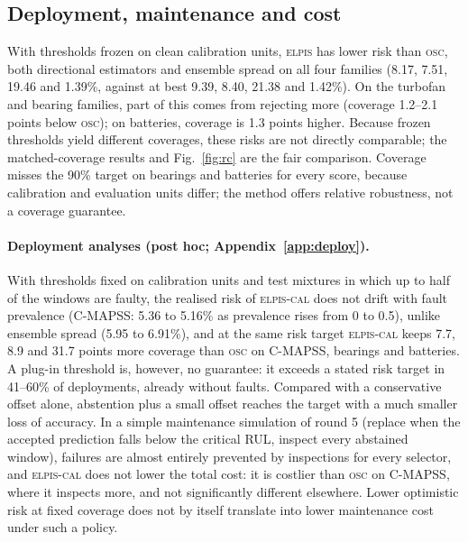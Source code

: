 \documentclass{esannV2}
\newcommand{\OSC}{\textsc{osc}}
\newcommand{\RPT}{\textsc{elpis}}
\newcommand{\AUTO}{\textsc{elpis-cal}}
\begin{document}
\FloatBarrier
\subsection{Deployment, maintenance and cost}
With thresholds frozen on clean calibration units, \RPT{} has lower risk than \OSC, both directional estimators and ensemble spread on all four families (8.17, 7.51, 19.46 and 1.39\%, against at best 9.39, 8.40, 21.38 and 1.42\%). On the turbofan and bearing families, part of this comes from rejecting more (coverage 1.2--2.1 points below \OSC); on batteries, coverage is 1.3 points higher. Because frozen thresholds yield different coverages, these risks are not directly comparable; the matched-coverage results and Fig.~\ref{fig:rc} are the fair comparison. Coverage misses the 90\% target on bearings and batteries for every score, because calibration and evaluation units differ; the method offers relative robustness, not a coverage guarantee.

\paragraph{Deployment analyses (post hoc; Appendix~\ref{app:deploy}).} With thresholds fixed on calibration units and test mixtures in which up to half of the windows are faulty, the realised risk of \AUTO{} does not drift with fault prevalence (C-MAPSS: 5.36 to 5.16\% as prevalence rises from 0 to 0.5), unlike ensemble spread (5.95 to 6.91\%), and at the same risk target \AUTO{} keeps 7.7, 8.9 and 31.7 points more coverage than \OSC{} on C-MAPSS, bearings and batteries. A plug-in threshold is, however, no guarantee: it exceeds a stated risk target in 41--60\% of deployments, already without faults. Compared with a conservative offset alone, abstention plus a small offset reaches the target with a much smaller loss of accuracy. In a simple maintenance simulation of round 5 (replace when the accepted prediction falls below the critical RUL, inspect every abstained window), failures are almost entirely prevented by inspections for every selector, and \AUTO{} does not lower the total cost: it is costlier than \OSC{} on C-MAPSS, where it inspects more, and not significantly different elsewhere. Lower optimistic risk at fixed coverage does not by itself translate into lower maintenance cost under such a policy.
\end{document}
